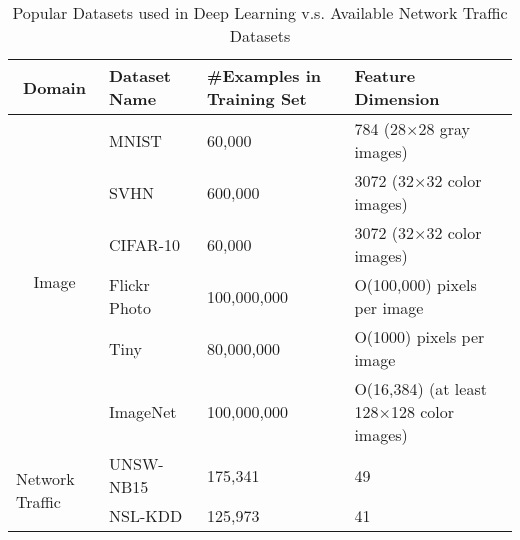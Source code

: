 \begin{table*}[]
\centering
\caption{Popular Datasets used in Deep Learning v.s. Available Network Traffic Datasets}
\label{Tab:Datasets}
\begin{tabular}{c|l|l|l}
\multicolumn{1}{c|}{Domain}                           & Dataset Name  & \#Examples in Training Set & Feature Dimension                         \\
\hline
\hline
\multirow{6}{*}{Image}                               & MNIST         & 60,000                     & 784 (28$\times$28 gray images)                 \\
                                                     & SVHN          & 600,000                    & 3072 (32$\times$32 color images)                 \\
                                                     & CIFAR-10      & 60,000                     & 3072 (32$\times$32 color images)                 \\
                                                     & Flickr Photo  & 100,000,000                & O(100,000) pixels per image               \\
                                                     & Tiny          & 80,000,000                 & O(1000) pixels per image                  \\
                                                     & ImageNet      & 100,000,000                & O(16,384) (at least 128$\times$128 color images) \\
\hline
\multicolumn{1}{l|}{\multirow{2}{*}{Network Traffic}} & UNSW-NB15     & 175,341                    & 49                                        \\
\multicolumn{1}{l|}{}                                 & NSL-KDD       & 125,973                    & 41                                       
\end{tabular}
\end{table*}
